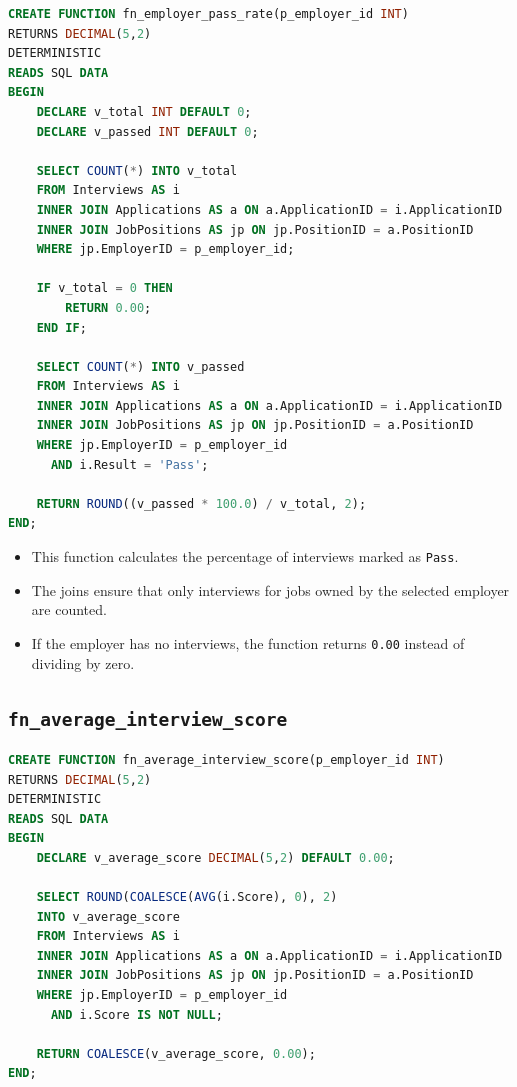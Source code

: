 \documentclass[11pt,a4paper]{report}
\begin{document}
\begin{lstlisting}[language=SQL,caption={Function that calculates employer pass rate}]
CREATE FUNCTION fn_employer_pass_rate(p_employer_id INT)
RETURNS DECIMAL(5,2)
DETERMINISTIC
READS SQL DATA
BEGIN
    DECLARE v_total INT DEFAULT 0;
    DECLARE v_passed INT DEFAULT 0;

    SELECT COUNT(*) INTO v_total
    FROM Interviews AS i
    INNER JOIN Applications AS a ON a.ApplicationID = i.ApplicationID
    INNER JOIN JobPositions AS jp ON jp.PositionID = a.PositionID
    WHERE jp.EmployerID = p_employer_id;

    IF v_total = 0 THEN
        RETURN 0.00;
    END IF;

    SELECT COUNT(*) INTO v_passed
    FROM Interviews AS i
    INNER JOIN Applications AS a ON a.ApplicationID = i.ApplicationID
    INNER JOIN JobPositions AS jp ON jp.PositionID = a.PositionID
    WHERE jp.EmployerID = p_employer_id
      AND i.Result = 'Pass';

    RETURN ROUND((v_passed * 100.0) / v_total, 2);
END;
\end{lstlisting}

\begin{itemize}[leftmargin=1.2cm,itemsep=0.1em]
  \item This function calculates the percentage of interviews marked as \texttt{Pass}.
  \item The joins ensure that only interviews for jobs owned by the selected employer are counted.
  \item If the employer has no interviews, the function returns \texttt{0.00} instead of dividing by zero.
\end{itemize}

\subsection*{\texttt{fn\_average\_interview\_score}}

\begin{lstlisting}[language=SQL,caption={Function that calculates average interview score}]
CREATE FUNCTION fn_average_interview_score(p_employer_id INT)
RETURNS DECIMAL(5,2)
DETERMINISTIC
READS SQL DATA
BEGIN
    DECLARE v_average_score DECIMAL(5,2) DEFAULT 0.00;

    SELECT ROUND(COALESCE(AVG(i.Score), 0), 2)
    INTO v_average_score
    FROM Interviews AS i
    INNER JOIN Applications AS a ON a.ApplicationID = i.ApplicationID
    INNER JOIN JobPositions AS jp ON jp.PositionID = a.PositionID
    WHERE jp.EmployerID = p_employer_id
      AND i.Score IS NOT NULL;

    RETURN COALESCE(v_average_score, 0.00);
END;
\end{lstlisting}
\end{document}
